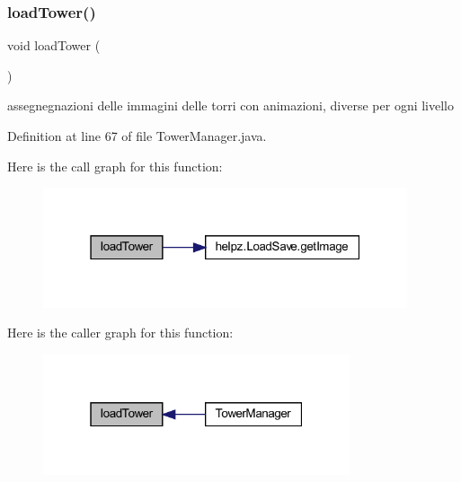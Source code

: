 \mbox{\label{classmanagers_1_1_tower_manager_afcea12e616fbcfcaf7b40fba856f22ca}} 
\subsubsection{\texorpdfstring{load\+Tower()}{loadTower()}}
{\footnotesize\ttfamily void load\+Tower (\begin{DoxyParamCaption}{ }\end{DoxyParamCaption})\hspace{0.3cm}{\ttfamily [private]}}



assegnegnazioni delle immagini delle torri con animazioni, diverse per ogni livello 



Definition at line 67 of file Tower\+Manager.\+java.

Here is the call graph for this function\+:\nopagebreak
\begin{figure}[H]
\begin{center}
\leavevmode
\includegraphics[width=304pt]{classmanagers_1_1_tower_manager_afcea12e616fbcfcaf7b40fba856f22ca_cgraph}
\end{center}
\end{figure}
Here is the caller graph for this function\+:\nopagebreak
\begin{figure}[H]
\begin{center}
\leavevmode
\includegraphics[width=256pt]{classmanagers_1_1_tower_manager_afcea12e616fbcfcaf7b40fba856f22ca_icgraph}
\end{center}
\end{figure}
\mbox{\label{classmanagers_1_1_tower_manager_addba85b44e35a186e066b2e801f433c4}} 
